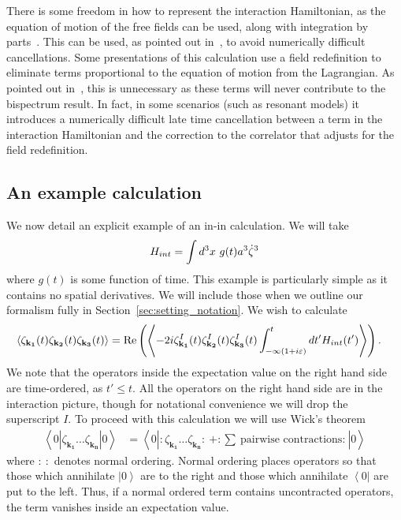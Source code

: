 There is some freedom in how to represent the interaction Hamiltonian,
as the equation of motion of the free fields can be used, along with integration by parts~\cite{rp_integ_by_parts}.
This can be used, as pointed out in~\cite{Funakoshi}, to avoid numerically difficult cancellations.
Some presentations of this calculation use a field redefinition to eliminate terms
proportional to the equation of motion from the Lagrangian.
As pointed out in~\cite{px_burrage},
this is unnecessary as these terms will never contribute to the bispectrum result.
In fact, in some scenarios (such as resonant models) it introduces a numerically difficult
late time cancellation between a term in the interaction Hamiltonian and the
correction to the correlator that adjusts for the field redefinition.




\subsection{An example calculation}
We now detail an explicit example of an in-in calculation.
We will take
\begin{align}\label{hint_example}
    H_{int}=\int d^3x~g(t) a^3{\dot{\zeta}^3}
\end{align}
where $g(t)$ is some function of time.
This example is particularly simple as it contains no spatial derivatives.
We will include those when we outline our formalism fully in Section~\ref{sec:setting_notation}.
We wish to calculate
\begin{align}\label{inin_example}
    \left<\zeta_{\mathbf{k_1}}(t)\zeta_{\mathbf{k_2}}(t)\zeta_{\mathbf{k_3}}(t)\right>&=
    \operatorname{Re}\left(\left<-2i \zeta^I_{\mathbf{k_1}}(t)\zeta^I_{\mathbf{k_2}}(t)\zeta^I_{\mathbf{k_3}}(t)
    \int_{-\infty(1+i\varepsilon)}^{t}dt'H_{int}(t')
    \right>\right).
\end{align}
We note that the operators inside the expectation value on the right hand side are
time-ordered, as $t'\leq t$.
All the operators on the right hand side are in the interaction picture, though for
notational convenience we will drop the superscript $I$.
To proceed with this calculation we will use Wick's theorem
\begin{align}\label{wick}
    \left<0\left|\zeta_{\mathbf{k_1}}\ldots\zeta_{\mathbf{k_n}}\right|0\right>
    &= \left<0\left|:\zeta_{\mathbf{k_1}}\ldots\zeta_{\mathbf{k_n}}:~+:\sum~\text{pairwise contractions:}~\right|0\right>
\end{align}
where $:~:$ denotes normal ordering. Normal ordering places operators so that those
which annihilate $\left|0\right>$ are to the right and those which annihilate
$\left<0\right|$ are put to the left. Thus, if a normal ordered term contains
uncontracted operators, the term vanishes inside an expectation value.


